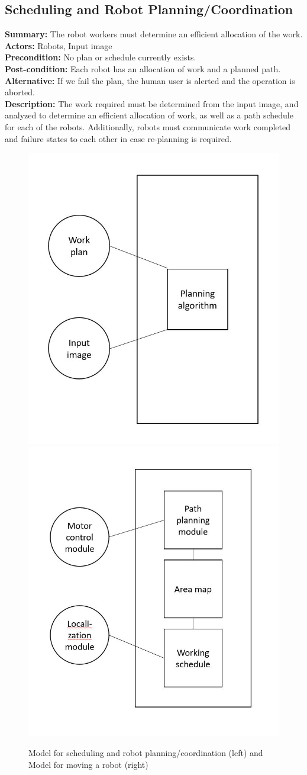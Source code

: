 \subsection{Scheduling and Robot Planning/Coordination}
\textbf{Summary:} The robot workers must determine an efficient allocation of the work. \\
\textbf{Actors:} Robots, Input image \\
\textbf{Precondition:} No plan or schedule currently exists. \\
\textbf{Post-condition:} Each robot has an allocation of work and a planned path. \\
\textbf{Alternative:} If we fail the plan, the human user is alerted and the operation is aborted. \\
\textbf{Description:} The work required must be determined from the input image, and analyzed to determine an efficient allocation of work, as well as a path schedule for each of the robots. Additionally, robots must communicate work completed and failure states to each other in case re-planning is required. \\

\begin{figure}
 \centering
  \includegraphics[width=0.48\columnwidth]{figs/use_case-planning_coordination.jpg}
	\includegraphics[width=0.48\columnwidth]{figs/use_case-moving.jpg}
	\caption{Model for scheduling and robot planning/coordination (left) and Model for moving a robot (right)}
 \label{fig:scheduling_moving}
\end{figure}

